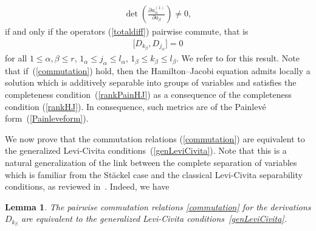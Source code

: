 \documentclass[pdftex]{sigma}
\numberwithin{equation}{section}
\newtheorem{Lemma}[Theorem]{Lemma}
\newcommand{\jalpha}{j_{\alpha}}
\newcommand{\kbeta}{k_{\beta}}
\newcommand{\lbeta}{l_{\beta}}
\newcommand{\lalpha}{l_{\alpha}}
\begin{document}
\begin{gather}\label{rankHJ}
\det\left(\frac{\partial u^{(1)}_{\alpha}}{\partial a_{\beta}}\right)\neq 0,
\end{gather}
if and only if the operators (\ref{totaldiff}) pairwise commute, that is
\begin{gather}\label{commutation}
\big[D_{\kbeta},D_{\jalpha}\big]=0
\end{gather}
for all $1\leq \alpha, \beta \leq r$, $1_{\alpha}\leq \jalpha\leq \lalpha$, $1_{\beta}\leq \kbeta\leq \lbeta$. We refer to \cite[Theorem~2.1]{BCR1-2002} for this result. Note that if~(\ref{commutation}) hold, then the Hamilton--Jacobi equation admits locally a solution which is additively separable into groups of variables and satisfies the completeness condition~(\ref{rankPainHJ}) as a consequence of the completeness condition (\ref{rankHJ}). In consequence, such metrics are of the Painlev\'e form~(\ref{Painleveform}).

We now prove that the commutation relations (\ref{commutation}) are equivalent to the generalized Levi-Civita conditions~(\ref{genLeviCivita}). Note that this is a natural generalization of the link between the complete separation of variables which is familiar from the St\"ackel case and the classical Levi-Civita separability conditions, as reviewed in~\cite{BCR1-2002,KaMi1984}. Indeed, we have
\begin{Lemma}
The pairwise commutation relations \eqref{commutation} for the derivations $D_{\kbeta}$ are equivalent to the generalized Levi-Civita conditions~\eqref{genLeviCivita}.
\end{Lemma}
\end{document}
